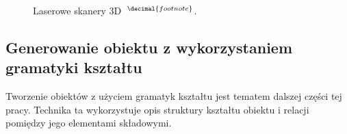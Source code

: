 \addtocounter{footnote}{1}
\begin{figure}[h]
  \centering
  \quad
  \caption[Lserowe skanery 3D]{Laserowe skanery 3D~$^{\decimal{footnote}}$.}
\end{figure}


\subsection{Generowanie obiektu z wykorzystaniem gramatyki kształtu}
Tworzenie obiektów z użyciem gramatyk kształtu jest tematem dalszej części tej
pracy. Technika ta wykorzystuje opis struktury kształtu obiektu i relacji
pomiędzy jego elementami składowymi.